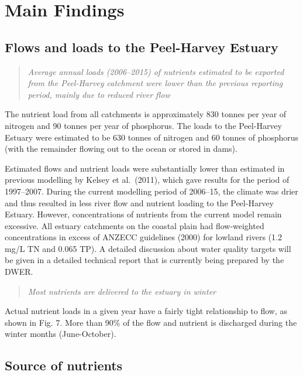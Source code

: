 \documentclass[
]{book}
\begin{document}
\hypertarget{main-findings-6}{%
\section{Main Findings}\label{main-findings-6}}

\hypertarget{flows-and-loads-to-the-peel-harvey-estuary}{%
\subsection{Flows and loads to the Peel-Harvey Estuary}\label{flows-and-loads-to-the-peel-harvey-estuary}}

\begin{quote}
\emph{Average annual loads (2006--2015) of nutrients estimated to be exported from the Peel-Harvey catchment were lower than the previous reporting period, mainly due to reduced river flow}
\end{quote}

The nutrient load from all catchments is approximately 830 tonnes per year of nitrogen and 90 tonnes per year of phosphorus. The loads to the Peel-Harvey Estuary were estimated to be 630 tonnes of nitrogen and 60 tonnes of phosphorus (with the remainder flowing out to the ocean or stored in dams).~

Estimated flows and nutrient loads were substantially lower than estimated in previous modelling by Kelsey et al.~(2011), which gave results for the period of 1997--2007. During the current modelling period of 2006--15, the climate was drier and thus resulted in less river flow and nutrient loading to the Peel-Harvey Estuary. However, concentrations of nutrients from the current model remain excessive. All estuary catchments on the coastal plain had flow-weighted concentrations in excess of ANZECC guidelines (2000) for lowland rivers (1.2 mg/L TN and 0.065 TP). A detailed discussion about water quality targets will be given in a detailed technical report that is currently being prepared by the DWER.

\begin{quote}
\emph{Most nutrients are delivered to the estuary in winter}
\end{quote}

Actual nutrient loads in a given year have a fairly tight relationship to flow, as shown in Fig. 7. More than 90\% of the flow and nutrient is discharged during the winter months (June-October).

\hypertarget{source-of-nutrients}{%
\subsection{Source of nutrients}\label{source-of-nutrients}}
\end{document}
